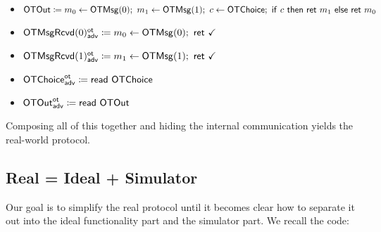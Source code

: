 \begin{itemize}
\item $\OTOut \coloneqq m_0 \leftarrow \OTMsg(0); \ m_1 \leftarrow \OTMsg(1); \ c \leftarrow \OTChoice; \ \ifte{c}{\ret{m_1}}{\ret{m_0}}$
\item {\color{blue} $\LeakOTMsgRcvd(0)^\ot_\adv \coloneqq m_0 \leftarrow \OTMsg(0); \ \ret{\checkmark}$}
\item {\color{blue} $\LeakOTMsgRcvd(1)^\ot_\adv \coloneqq m_1 \leftarrow \OTMsg(1); \ \ret{\checkmark}$}
\item {\color{blue} $\mathsf{OTChoice}^{\mathsf{ot}}_{\mathsf{adv}} \coloneqq \mathsf{read} \ \mathsf{OTChoice}$}
\item {\color{blue} $\mathsf{OTOut}^{\mathsf{ot}}_{\mathsf{adv}} \coloneqq \mathsf{read} \ \mathsf{OTOut}$}
\end{itemize}
Composing all of this together and hiding the internal communication yields the real-world protocol.

\subsection{Real = Ideal + Simulator}
Our goal is to simplify the real protocol until it becomes clear how to separate it out into the ideal functionality part and the simulator part. We recall the code:

